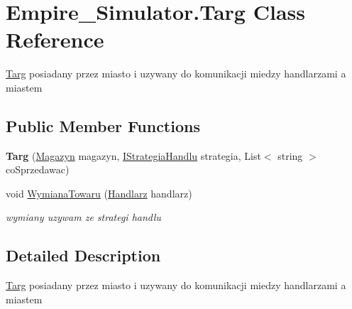 \hypertarget{class_empire___simulator_1_1_targ}{\section{Empire\+\_\+\+Simulator.\+Targ Class Reference}
\label{class_empire___simulator_1_1_targ}
}


\hyperlink{class_empire___simulator_1_1_targ}{Targ} posiadany przez miasto i uzywany do komunikacji miedzy handlarzami a miastem  


\subsection*{Public Member Functions}
\begin{DoxyCompactItemize}
\item 
\hypertarget{class_empire___simulator_1_1_targ_a60eb64c3d36cf5483bb68cfb39cee9b4}{{\bfseries Targ} (\hyperlink{class_empire___simulator_1_1_magazyn}{Magazyn} magazyn, \hyperlink{interface_empire___simulator_1_1_i_strategia_handlu}{I\+Strategia\+Handlu} strategia, List$<$ string $>$ co\+Sprzedawac)}\label{class_empire___simulator_1_1_targ_a60eb64c3d36cf5483bb68cfb39cee9b4}

\item 
void \hyperlink{class_empire___simulator_1_1_targ_a88a802730bc74d2f256d97700b98a102}{Wymiana\+Towaru} (\hyperlink{class_empire___simulator_1_1_handlarz}{Handlarz} handlarz)
\begin{DoxyCompactList}\small\item\em wymiany uzywam ze strategi handlu \end{DoxyCompactList}\end{DoxyCompactItemize}


\subsection{Detailed Description}
\hyperlink{class_empire___simulator_1_1_targ}{Targ} posiadany przez miasto i uzywany do komunikacji miedzy handlarzami a miastem 



